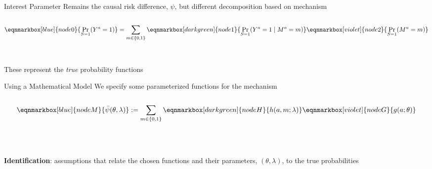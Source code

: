 \documentclass[aspectratio=169]{beamer}
\begin{document}
\begin{frame}{Interest Parameter}
	Remains the causal risk difference, $\psi$, but different decomposition based on mechanism
	~\\~\\
	\begin{equation*}
		\eqnmarkbox[blue]{node0}{\Pr_{S=1}(Y^a = 1)} = \sum_{m \in \{0, 1\}} \eqnmarkbox[darkgreen]{node1}{\Pr_{S=1}(Y^a = 1 \mid M^a = m)} \eqnmarkbox[violet]{node2}{\Pr_{S=1}(M^a = m)}
	\end{equation*}
	~\\~\\
	These represent the \textit{true} probability functions
\end{frame}

\begin{frame}{Using a Mathematical Model}
	We specify some parameterized functions for the mechanism
	~\\~\\
	\begin{equation*}
		\eqnmarkbox[blue]{nodeM}{\bar{\psi}(\theta, \lambda)} := \sum_{m \in \{0, 1\}} \eqnmarkbox[darkgreen]{nodeH}{h(a,m; \lambda)} \eqnmarkbox[violet]{nodeG}{g(a; \theta)}
	\end{equation*}
	~\\~\\~\\
	\textbf{Identification}: assumptions that relate the chosen functions and their parameters, $(\theta, \lambda)$, to the true probabilities
\end{frame}
\end{document}
